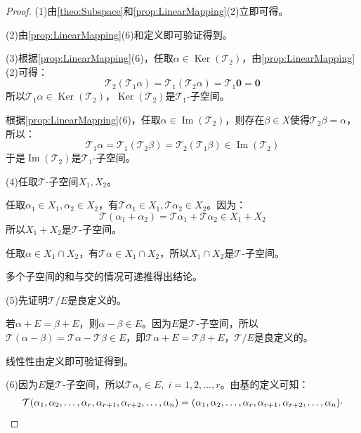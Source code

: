 \begin{proof}
	(1)由\cref{theo:Subspace}和\cref{prop:LinearMapping}(2)立即可得。\par
	(2)由\cref{prop:LinearMapping}(6)和定义即可验证得到。\par
	(3)根据\cref{prop:LinearMapping}(6)，任取$\alpha\in\operatorname{Ker}(\mathcal{T}_2)$，由\cref{prop:LinearMapping}(2)可得：
	\begin{equation*}
		\mathcal{T}_2(\mathcal{T}_1\alpha)=\mathcal{T}_1(\mathcal{T}_2\alpha)=\mathcal{T}_1\mathbf{0}=\mathbf{0}
	\end{equation*}
	所以$\mathcal{T}_1\alpha\in\operatorname{Ker}(\mathcal{T}_2)$，$\operatorname{Ker}(\mathcal{T}_2)$是$\mathcal{T}_1$-子空间。\par
	根据\cref{prop:LinearMapping}(6)，任取$\alpha\in\operatorname{Im}(\mathcal{T}_2)$，则存在$\beta\in X$使得$\mathcal{T}_2\beta=\alpha$，所以：
	\begin{equation*}
		\mathcal{T}_1\alpha=\mathcal{T}_1(\mathcal{T}_2\beta)=\mathcal{T}_2(\mathcal{T}_1\beta)\in\operatorname{Im}(\mathcal{T}_2)
	\end{equation*}
	于是$\operatorname{Im}(\mathcal{T}_2)$是$\mathcal{T}_1$-子空间。\par
	(4)任取$\mathcal{T}$-子空间$X_1,X_2$。\par
	任取$\alpha_1\in X_1,\alpha_2\in X_2$，有$\mathcal{T}\alpha_1\in X_1,\mathcal{T}\alpha_2\in X_2$。因为：
	\begin{equation*}
		\mathcal{T}(\alpha_1+\alpha_2)=\mathcal{T}\alpha_1+\mathcal{T}\alpha_2\in X_1+X_2
	\end{equation*}
	所以$X_1+X_2$是$\mathcal{T}$-子空间。\par
	任取$\alpha\in X_1\cap X_2$，有$\mathcal{T}\alpha\in X_1\cap X_2$，所以$X_1\cap X_2$是$\mathcal{T}$-子空间。\par
	多个子空间的和与交的情况可递推得出结论。\par
	(5)先证明$\mathcal{T}/E$是良定义的。\par
	若$\alpha+E=\beta+E$，则$\alpha-\beta\in E$。因为$E$是$\mathcal{T}$-子空间，所以$\mathcal{T}(\alpha-\beta)=\mathcal{T}\alpha-\mathcal{T}\beta\in E$，即$\mathcal{T}\alpha+E=\mathcal{T}\beta+E$，$\mathcal{T}/E$是良定义的。\par
	线性性由定义即可验证得到。\par
	(6)因为$E$是$\mathcal{T}$-子空间，所以$\mathcal{T}\alpha_i\in E,\;i=1,2,\dots,r$。由基的定义可知：
	\begin{gather*}
		\mathcal{T}(\seq{\alpha}{r},\alpha_{r+1},\alpha_{r+2},\dots,\alpha_n)=(\seq{\alpha}{r},\alpha_{r+1},\alpha_{r+2},\dots,\alpha_n)\cdot \\

\end{gather*}
\end{proof}
